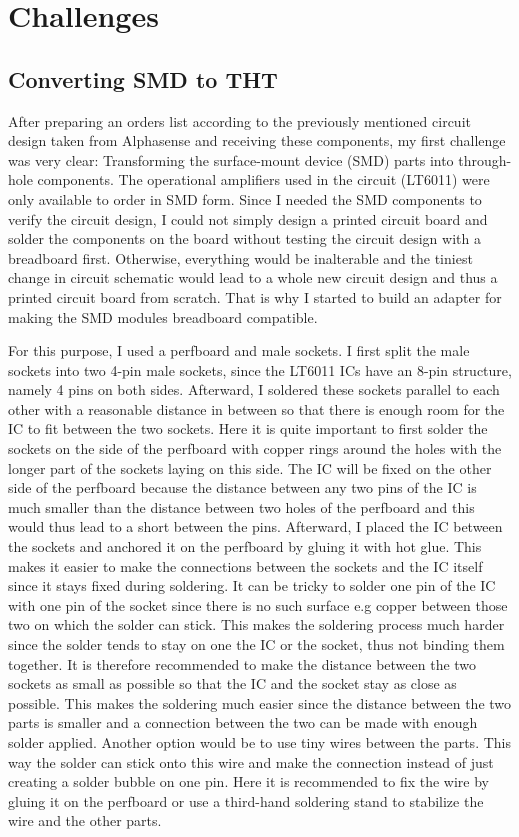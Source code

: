 \chapter{Challenges}
\label{sec:challenges}

\section{Converting SMD to THT}
After preparing an orders list according to the previously mentioned circuit design taken from Alphasense \cite{2009} and receiving these components, my first challenge was very clear: Transforming the surface-mount device (SMD) parts into through-hole components. The operational amplifiers used in the circuit (LT6011) were only available to order in SMD form. Since I needed the SMD components to verify the circuit design, I could not simply design a printed circuit board and solder the components on the board without testing the circuit design with a breadboard first. Otherwise, everything would be inalterable and the tiniest change in circuit schematic would lead to a whole new circuit design and thus a printed circuit board from scratch. That is why I started to build an adapter for making the SMD modules breadboard compatible. \par 
For this purpose, I used a perfboard and male sockets. I first split the male sockets into two 4-pin male sockets, since the LT6011 ICs have an 8-pin structure, namely 4 pins on both sides. Afterward, I soldered these sockets parallel to each other with a reasonable distance in between so that there is enough room for the IC to fit between the two sockets. Here it is quite important to first solder the sockets on the side of the perfboard with copper rings around the holes with the longer part of the sockets laying on this side. The IC will be fixed on the other side of the perfboard because the distance between any two pins of the IC is much smaller than the distance between two holes of the perfboard and this would thus lead to a short between the pins. Afterward, I placed the IC between the sockets and anchored it on the perfboard by gluing it with hot glue. This makes it easier to make the connections between the sockets and the IC itself since it stays fixed during soldering. It can be tricky to solder one pin of the IC with one pin of the socket since there is no such surface e.g copper between those two on which the solder can stick. This makes the soldering process much harder since the solder tends to stay on one the IC or the socket, thus not binding them together. It is therefore recommended to make the distance between the two sockets as small as possible so that the IC and the socket stay as close as possible. This makes the soldering much easier since the distance between the two parts is smaller and a connection between the two can be made with enough solder applied. Another option would be to use tiny wires between the parts. This way the solder can stick onto this wire and make the connection instead of just creating a solder bubble on one pin. Here it is recommended to fix the wire by gluing it on the perfboard or use a third-hand soldering stand to stabilize the wire and the other parts.


